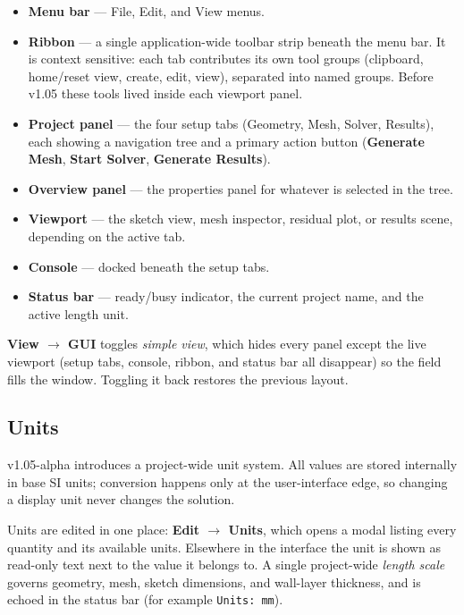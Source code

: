 \documentclass[11pt]{article}
\begin{document}
\begin{itemize}[nosep]
  \item \textbf{Menu bar} --- File, Edit, and View menus.
  \item \textbf{Ribbon} --- a single application-wide toolbar strip beneath the menu
        bar. It is context sensitive: each tab contributes its own tool groups
        (clipboard, home/reset view, create, edit, view), separated into named groups.
        Before v1.05 these tools lived inside each viewport panel.
  \item \textbf{Project panel} --- the four setup tabs (Geometry, Mesh, Solver,
        Results), each showing a navigation tree and a primary action button
        (\textbf{Generate Mesh}, \textbf{Start Solver}, \textbf{Generate Results}).
  \item \textbf{Overview panel} --- the properties panel for whatever is selected in
        the tree.
  \item \textbf{Viewport} --- the sketch view, mesh inspector, residual plot, or
        results scene, depending on the active tab.
  \item \textbf{Console} --- docked beneath the setup tabs.
  \item \textbf{Status bar} --- ready/busy indicator, the current project name, and the
        active length unit.
\end{itemize}

\textbf{View \(\rightarrow\) GUI} toggles \emph{simple view}, which hides every panel
except the live viewport (setup tabs, console, ribbon, and status bar all disappear) so
the field fills the window. Toggling it back restores the previous layout.

\subsection{Units}\label{sec:units}
v1.05-alpha introduces a project-wide unit system. All values are stored internally in
base SI units; conversion happens only at the user-interface edge, so changing a display
unit never changes the solution.

Units are edited in one place: \textbf{Edit \(\rightarrow\) Units}, which opens a modal
listing every quantity and its available units. Elsewhere in the interface the unit is
shown as read-only text next to the value it belongs to. A single project-wide
\emph{length scale} governs geometry, mesh, sketch dimensions, and wall-layer thickness,
and is echoed in the status bar (for example \texttt{Units: mm}).
\end{document}
